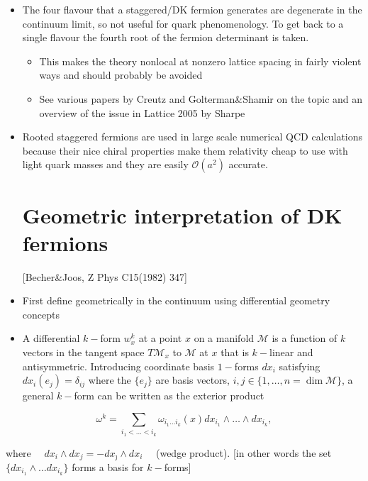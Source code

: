 \begin{itemize}
  \item The four flavour that a staggered/DK fermion generates are degenerate in the continuum limit, so not useful for quark phenomenology. To get back to a single flavour the fourth root of the fermion determinant is taken.
  \begin{itemize}
      \item This makes the theory nonlocal at nonzero lattice spacing in fairly violent ways and should probably be avoided
      \item See various papers by Creutz and Golterman\&Shamir on the topic and an overview of the issue in Lattice 2005 by Sharpe
  \end{itemize}
  \item Rooted staggered fermions are used in large scale numerical QCD calculations because their nice chiral properties make them relativity cheap to use with light quark masses and they are easily $\mathcal{O}(a^2)$ accurate.\\

\section{Geometric interpretation of DK fermions}

[Becher\&Joos, Z Phys C15(1982) 347]
  \item First define geometrically in the continuum using differential geometry concepts
  \item A differential $k-$form $w^k_x$ at a point $x$ on a manifold $\mathcal{M}$ is a function of $k$ vectors in the tangent space $T\mathcal{M}_x$ to $\mathcal{M}$ at $x$ that is $k-$linear and antisymmetric. Introducing coordinate basis $1-$forms $dx_i$ satisfying $dx_i(e_j) = \delta_{ij}$ where the $\{e_j\}$ are basis vectors, $i,j \in \{ 1,\ldots, n = \operatorname{dim}\mathcal{M}\}$, a general $k-$form can be written as the exterior product
\end{itemize}

\begin{equation}
\omega^{k}=\sum_{i_{1}<\ldots<i_{k}} \omega_{i_{1} \ldots i_{k}}(x) d x_{i_{1}} \wedge \ldots \wedge d x_{i_{k}},
\end{equation}

where \(\quad d x_{i} \wedge d x_{j}=-d x_{\jmath} \wedge d x_{i} \quad\) (wedge product). [in other words the set $\{dx_{i_1}\wedge\ldots dx_{i_k}\}$ forms a basis for $k-$forms]

